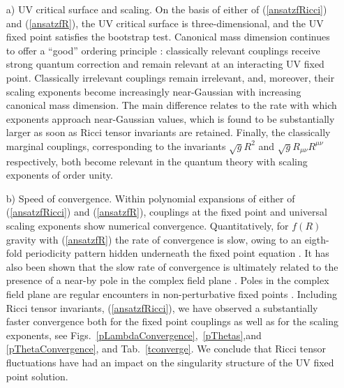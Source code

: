 \documentclass[notitlepage,eqsecnum,bm,amsmath,preprintnumbers,superscriptaddress,nofootinbib,aps,11pt]{revtex4-1}
\def\eq#1{(\ref{#1})}
\begin{document}
\begin{itemize}
\item[a)] 
UV critical surface and scaling. On the basis of either of \eq{ansatzfRicci} and \eq{ansatzfR}, the UV critical surface is three-dimensional, and the UV fixed point satisfies the bootstrap test. Canonical mass dimension continues to offer a ``good'' ordering principle \cite{Falls:2014tra}:  classically relevant couplings receive strong quantum correction and remain relevant at an interacting UV fixed point. Classically irrelevant couplings remain irrelevant, and, moreover, their scaling exponents become increasingly near-Gaussian with increasing canonical mass dimension. The main difference relates to the rate with which exponents approach near-Gaussian values, which is found to be substantially larger as soon as Ricci tensor invariants are retained. Finally, the classically marginal couplings, corresponding to the invariants $\sqrt{g}R^2$ and $\sqrt{g}R_{\mu\nu}R^{\mu\nu}$ respectively, both become relevant in the quantum theory with scaling exponents of order unity.  



\item[b)] 
Speed of convergence. Within polynomial expansions of  either of \eq{ansatzfRicci} and \eq{ansatzfR}, couplings at the fixed point and universal scaling exponents show numerical convergence. Quantitatively, for $f(R)$ gravity with \eq{ansatzfR} the rate of convergence is slow, owing to an eigth-fold periodicity pattern hidden underneath the fixed point equation \cite{Falls:2013bv,Falls:2014tra}. It has also been shown that the slow rate of convergence is ultimately  related to the presence of a near-by pole in the complex field plane \cite{Falls:2016wsa}.  Poles in the complex field plane are regular encounters in non-perturbative fixed points \cite{Morris:1994ki,Litim:2002cf,Litim:2016hlb,Juttner:2017cpr,Marchais:2017jqc}. Including Ricci tensor invariants, \eq{ansatzfRicci}, we have observed a substantially faster convergence both for the fixed point couplings as well as for the scaling exponents, see Figs.~\ref{pLambdaConvergence},~\ref{pThetas},and \ref{pThetaConvergence}, and Tab.~\ref{tconverge}. We conclude that Ricci tensor fluctuations have had an impact on the singularity structure of the UV fixed point solution.


\end{itemize}
\end{document}
